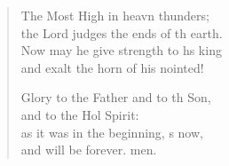 \begin{verse}
\begin{patverse}
The Most High in heavn thunders;\Med\\
the Lord judges the ends of th earth.\\
Now may he give strength to h\pointup{\i}s king\Med\\
and exalt the horn of his nointed!

Glory to the Father and to th Son,\Med\\
and to the Hol Spirit:\\
as it was in the beginning, \pointup{\i}s now,\Med\\
and will be forever. men.
  \end{patverse}
\end{verse}
